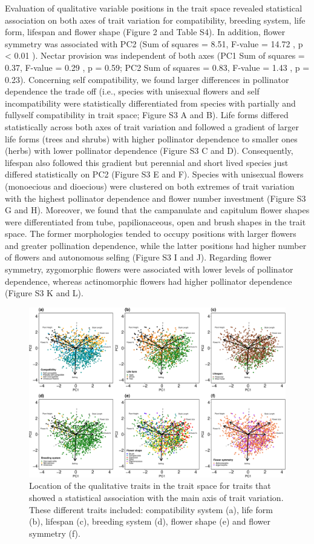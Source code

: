 \documentclass[11pt,a4paper,]{article}
\begin{document}
Evaluation of qualitative variable positions in the trait space revealed
statistical association on both axes of trait variation for
compatibility, breeding system, life form, lifespan and flower shape
(Figure 2 and Table S4). In addition, flower symmetry was associated
with PC2 (Sum of squares = 8.51, F-value = 14.72 , p \textless{} 0.01 ).
Nectar provision was independent of both axes (PC1 Sum of squares =
0.37, F-value = 0.29 , p = 0.59; PC2 Sum of squares = 0.83, F-value =
1.43 , p = 0.23). Concerning self compatibility, we found larger
differences in pollinator dependence the trade off (i.e., species with
unisexual flowers and self incompatibility were statistically
differentiated from species with partially and fullyself compatibility
in trait space; Figure S3 A and B). Life forms differed statistically
across both axes of trait variation and followed a gradient of larger
life forms (trees and shrubs) with higher pollinator dependence to
smaller ones (herbs) with lower pollinator dependence (Figure S3 C and
D). Consequently, lifespan also followed this gradient but perennial and
short lived species just differed statistically on PC2 (Figure S3 E and
F). Species with unisexual flowers (monoecious and dioecious) were
clustered on both extremes of trait variation with the highest
pollinator dependence and flower number investment (Figure S3 G and H).
Moreover, we found that the campanulate and capitulum flower shapes were
differentiated from tube, papilionaceous, open and brush shapes in the
trait space. The former morphologies tended to occupy positions with
larger flowers and greater pollination dependence, while the latter
positions had higher number of flowers and autonomous selfing (Figure S3
I and J). Regarding flower symmetry, zygomorphic flowers were associated
with lower levels of pollinator dependence, whereas actinomorphic
flowers had higher pollinator dependence (Figure S3 K and L).

\begin{figure}
\centering
\includegraphics{output/figures/unnamed-chunk-3-1.pdf}
\caption{\label{fig:unnamed-chunk-3}Location of the qualitative traits in
the trait space for traits that showed a statistical association with
the main axis of trait variation. These different traits included:
compatibility system (a), life form (b), lifespan (c), breeding system
(d), flower shape (e) and flower symmetry (f).}
\end{figure}
\end{document}
